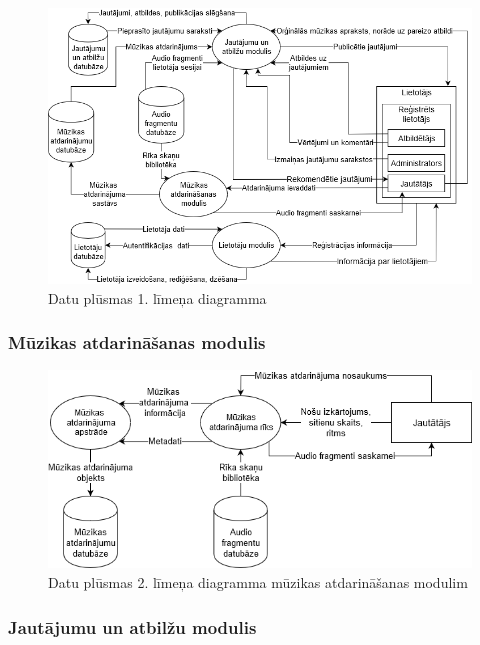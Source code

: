 \documentclass[12pt]{article}
\begin{document}
\begin{figure}[H]
\begin{center}
	\includegraphics[scale=0.5]{DPD1.png}
	\caption{Datu plūsmas 1. līmeņa diagramma}
	\label{fig:dpd_1}
\end{center}
\end{figure}

\subsubsection{Mūzikas atdarināšanas modulis}

\begin{figure}[H]
\begin{center}
	\includegraphics[scale=0.5]{DPD2_1.png}
	\caption{Datu plūsmas 2. līmeņa diagramma mūzikas atdarināšanas modulim}
	\label{fig:dpd_2_1}
\end{center}
\end{figure}

\subsubsection{Jautājumu un atbilžu modulis}
\end{document}
